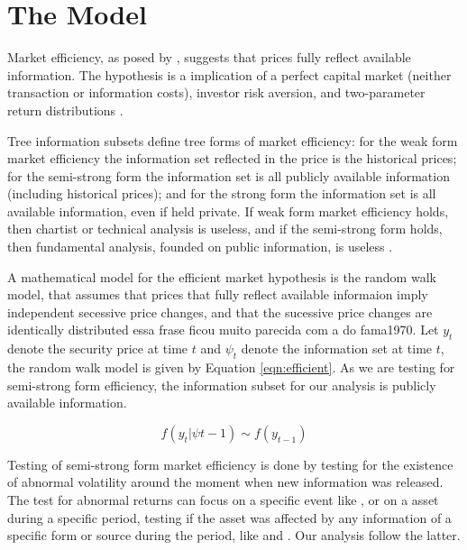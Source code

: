 \documentclass[cic,tc, english]{iiufrgs}
\begin{document}
\chapter{The Model} \label{chapter_model}

    Market efficiency, as posed by \citet{fama1970}, suggests that prices fully reflect available information. The hypothesis is a implication of a perfect capital market {(neither transaction or information costs)}, investor risk aversion, and two-parameter return distributions \citet{famamcbeth1973}.

    \begin{comment}
        providing accurate signals for resource allocation. Prices should reflect information as it reflects the forecasts of future prices, which should be revised with the arrival of new information.
    \end{comment}

    Tree information subsets define tree forms of market efficiency: for the weak form market efficiency the information set reflected in the price is the historical prices; for the semi-strong form the information set is all publicly available information (including historical prices); and for the strong form the information set is all available information, even if held private. If weak form market efficiency holds, then chartist or technical analysis is useless, and if the semi-strong form holds, then fundamental analysis, founded on public information, is useless \citet{oprean2012}.

    A mathematical model for the efficient market hypothesis is the random walk model, that assumes that prices that fully reflect available informaion imply independent secessive price changes, and that the sucessive price changes are identically distributed \citet{fama1970} {essa frase ficou muito parecida com a do fama1970}. Let $y_t$ denote the security price at time $t$ and $\psi_t$ denote the information set at time $t$, the random walk model is given by Equation \ref{eqn:efficient}. As we are testing for semi-strong form efficiency, the information subset for our analysis is publicly available information.

    \begin{equation}
        \label{eqn:efficient}
        f ( y_t | \psi{t-1} ) \sim f(y_{t-1})
    \end{equation}

    Testing of semi-strong form market efficiency is done by testing for the existence of abnormal volatility around the moment when new information was released. The test for abnormal returns can focus on a specific event like \citet{gabrielribeiro2013}, or on a asset during a specific period, testing if the asset was affected by any information of a specific form or source during the period, like \citet{larsenthorsrud2017} and \citet{caporaleetal2015}. Our analysis follow the latter.
\end{document}
